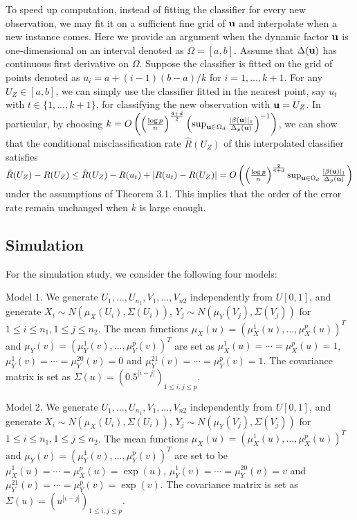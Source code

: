 \documentclass[11pt]{article}
\theoremstyle{definition}
\begin{document}
 To speed up computation, instead of fitting the classifier for every new observation, we may fit it on a sufficient fine grid of ${\bf u}$ and interpolate when a new instance comes. Here we provide an argument when the dynamic factor ${\bf u}$ is one-dimensional on an interval denoted as $\Omega=[a,b]$.  Assume that  $\Delta({\bf u})$ has continuous first derivative on $\Omega$. Suppose the classifier is fitted on the grid of points denoted as  $u_i=a+(i-1)(b-a)/k$ for $i=1,\ldots, k+1$. For any $U_Z\in [a,b]$, we can simply use the classifier fitted in the nearest point, say $u_t$ with $t\in\{1,\ldots, k+1\}$, for classifying the new observation with ${\bf u}=U_Z$. In particular,  by choosing  $k=O\left( \left(\frac{\log p}{n}\right)^{\frac{4+d}{2}}\left(\sup_{{\bf u}\in \Omega_d}\frac{|\beta({\bf u})|_1}{\Delta_p({\bf u})}\right)^{-1}\right)$, we can show that the conditional misclassification rate $\hat{R}(U_Z)$ of this interpolated classifier satisfies $\hat{R}(U_Z)-R(U_Z)\leq \hat{R}(U_Z)-R(u_t)+|R(u_t)-R(U_Z)|=O\left( \left(\frac{\log p}{n}\right)^{\frac{2}{4+d}}\sup_{{\bf u}\in \Omega_d}\frac{|\beta({\bf u})|_1}{\Delta_p({\bf u})}\right)$ under the assumptions of Theorem 3.1. This implies that the order of the error rate remain unchanged when $k$ is large enough.  
 
 \subsection{Simulation}
 For the simulation study, we consider the following four models:
 
 {\rm Model 1.} We generate $U_1,\ldots, U_{n_1},V_{1},\ldots, V_{n2}$ independently from $U[0,1]$, and generate $X_i\sim N(\mu_X(U_i),\Sigma(U_i))$, $Y_j\sim N(\mu_Y(V_j),\Sigma(V_j))$ for $1\leq i\leq n_1, 1\leq j\leq n_2$. The mean functions $\mu_X(u)=(\mu^1_X(u),\ldots,\mu_X^p(u))^T$ and $\mu_Y(v)=(\mu^1_Y(v),\ldots,\mu_Y^p(v))^T$ are set as $\mu^1_X(u)=\cdots=\mu^p_X(u)=1$, $\mu^1_Y(v)=\cdots=\mu^{20}_Y(v)=0$ and $\mu^{21}_Y(v)=\cdots=\mu^p_Y(v)=1$. The covariance matrix is set as $\Sigma(u)=(0.5^{|i-j|})_{1\leq i,j\leq p}$.
 
 {\rm Model 2.} We generate $U_1,\ldots, U_{n_1},V_{1},\ldots, V_{n2}$ independently from $U[0,1]$, and generate $X_i\sim N(\mu_X(U_i),\Sigma(U_i))$, $Y_j\sim N(\mu_Y(V_j),\Sigma(V_j))$ for $1\leq i\leq n_1, 1\leq j\leq n_2$. The mean functions $\mu_X(u)=(\mu^1_X(u),\ldots,\mu_X^p(u))^T$ and $\mu_Y(v)=(\mu^1_Y(v),\ldots,\mu_Y^p(v))^T$ are set to be $\mu^1_X(u)=\cdots=\mu^p_X(u)=\exp(u)$, $\mu^1_Y(v)=\cdots=\mu^{20}_Y(v)=v$ and $\mu^{21}_Y(v)=\cdots=\mu^p_Y(v)=\exp(v)$. The covariance matrix is set as $\Sigma(u)=(u^{|i-j|})_{1\leq i,j\leq p}$.
 
\end{document}
